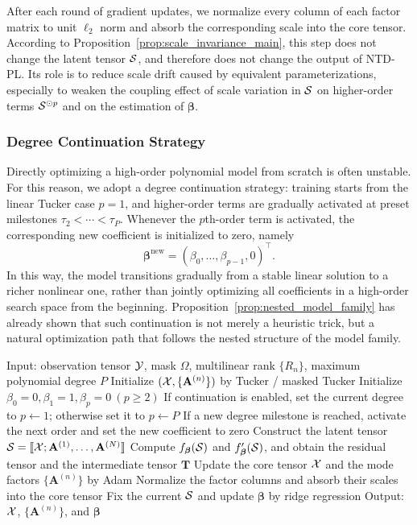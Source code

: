 After each round of gradient updates, we normalize every column of each factor matrix to unit $\ell_2$ norm and absorb the corresponding scale into the core tensor. According to Proposition~\ref{prop:scale_invariance_main}, this step does not change the latent tensor $\mathcal{S}$, and therefore does not change the output of NTD-PL. Its role is to reduce scale drift caused by equivalent parameterizations, especially to weaken the coupling effect of scale variation in $\mathcal{S}$ on higher-order terms $\mathcal{S}^{\odot p}$ and on the estimation of $\boldsymbol\beta$.

\subsubsection{Degree Continuation Strategy}

Directly optimizing a high-order polynomial model from scratch is often unstable. For this reason, we adopt a degree continuation strategy: training starts from the linear Tucker case $p=1$, and higher-order terms are gradually activated at preset milestones $\tau_2<\cdots<\tau_P$. Whenever the $p$th-order term is activated, the corresponding new coefficient is initialized to zero, namely
\begin{equation}
\boldsymbol\beta^{\mathrm{new}}
=
(\beta_0,\dots,\beta_{p-1},0)^\top.
\end{equation}
In this way, the model transitions gradually from a stable linear solution to a richer nonlinear one, rather than jointly optimizing all coefficients in a high-order search space from the beginning. Proposition~\ref{prop:nested_model_family} has already shown that such continuation is not merely a heuristic trick, but a natural optimization path that follows the nested structure of the model family.

\begin{algorithm}[t]
\caption{NTD-PL with alternating optimization and degree continuation.}
\label{alg:ntdpl}
\begin{algorithmic}[1]
\State Input: observation tensor $\mathcal{Y}$, mask $\Omega$, multilinear rank $\{R_n\}$, maximum polynomial degree $P$
\State Initialize $(\mathcal{X},\{\mathbf A^{(n)}\})$ by Tucker / masked Tucker
\State Initialize $\beta_0=0,\beta_1=1,\beta_p=0\ (p\ge 2)$
\State If continuation is enabled, set the current degree to $p\leftarrow 1$; otherwise set it to $p\leftarrow P$
    \State If a new degree milestone is reached, activate the next order and set the new coefficient to zero
    \State Construct the latent tensor $\mathcal{S}=\llbracket \mathcal{X};\mathbf A^{(1)},\dots,\mathbf A^{(N)}\rrbracket$
    \State Compute $f_{\boldsymbol\beta}(\mathcal{S})$ and $f'_{\boldsymbol\beta}(\mathcal{S})$, and obtain the residual tensor and the intermediate tensor $\mathbf T$
    \State Update the core tensor $\mathcal{X}$ and the mode factors $\{\mathbf A^{(n)}\}$ by Adam
    \State Normalize the factor columns and absorb their scales into the core tensor
        \State Fix the current $\mathcal{S}$ and update $\boldsymbol\beta$ by ridge regression
    \EndIf
\EndFor
\State Output: $\mathcal{X}$, $\{\mathbf A^{(n)}\}$, and $\boldsymbol\beta$
\end{algorithmic}
\end{algorithm}

